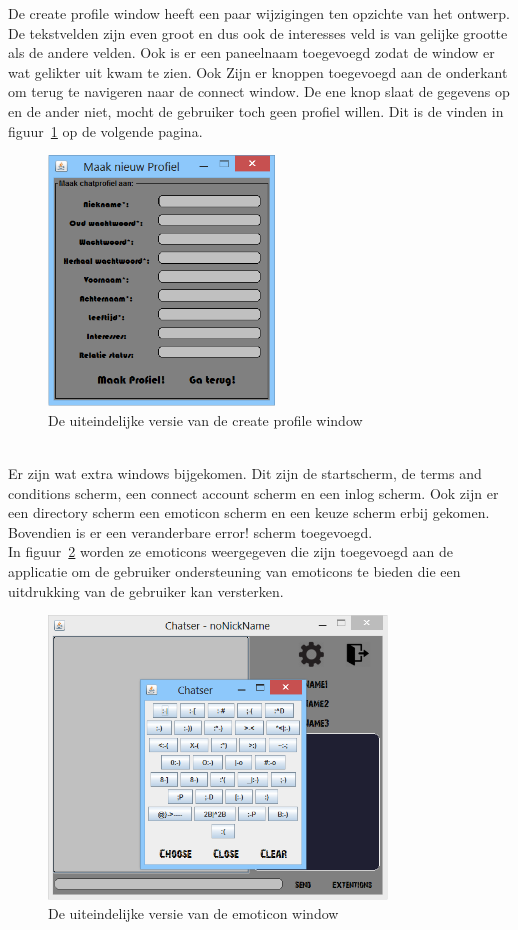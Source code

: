 \documentclass[12pt]{article}
\begin{document}
\noindent De create profile window heeft een paar wijzigingen ten opzichte van het ontwerp. De tekstvelden zijn even groot en dus ook de interesses veld is van gelijke grootte als de andere velden. Ook is er een paneelnaam toegevoegd zodat de window er wat gelikter uit kwam te zien. Ook Zijn er knoppen toegevoegd aan de onderkant om terug te navigeren naar de connect window. De ene knop slaat de gegevens op en de ander niet, mocht de gebruiker toch geen profiel willen. Dit is de vinden in figuur~\ref{figure012} op de volgende pagina.
\begin{figure}[ht]
\begin{center}
\includegraphics[width = 60mm]{MaakProfielGUI}
\caption{De uiteindelijke versie van de create profile window}
\label{figure012}
\end{center}
\end{figure}
\\
\newpage
\noindent Er zijn wat extra windows bijgekomen. Dit zijn de startscherm, de terms and conditions scherm,  een connect account scherm en een inlog scherm. Ook zijn er een directory scherm een emoticon scherm en een keuze scherm erbij gekomen. Bovendien is er een veranderbare error! scherm toegevoegd.
\\

\noindent In figuur~\ref{figure013} worden ze emoticons weergegeven die zijn toegevoegd aan de applicatie om de gebruiker ondersteuning van emoticons te bieden die een uitdrukking van de gebruiker kan versterken.
\begin{figure}[ht]
\begin{center}
\includegraphics[width = 90mm]{chatser_emoticons}
\caption{De uiteindelijke versie van de emoticon window}
\label{figure013}
\end{center}
\end{figure}
\\
\end{document}
